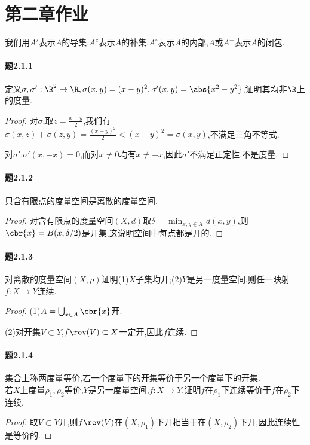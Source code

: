 \documentclass{article}
\begin{document}
\section{第二章作业}
我们用$A'$表示$A$的导集,$A^c$表示$A$的补集,$A^\circ$表示$A$的内部,$\overline{A}$或$A^-$表示$A$的闭包.

\paragraph{题2.1.1}定义$\sigma,\sigma':\R^2\to\R, \sigma(x,y)=(x-y)^2, \sigma'(x,y)=\abs{x^2-y^2}$,证明其均非$\R$上的度量.
\begin{proof}
    对$\sigma$,取$z=\frac{x+y}{2}$,我们有$\sigma(x,z)+\sigma(z,y)=\frac{(x-y)^2}{2}<(x-y)^2=\sigma(x,y)$,不满足三角不等式.

    对$\sigma'$,$\sigma'(x,-x)=0$,而对$x\neq 0$均有$x\neq -x$,因此$\sigma'$不满足正定性,不是度量.
\end{proof}

\paragraph{题2.1.2}只含有限点的度量空间是离散的度量空间.
\begin{proof}
    对含有限点的度量空间$(X,d)$取$\delta=\min_{x,y\in X}d(x,y)$,则$\cbr{x}=B(x,\delta/2)$是开集,这说明空间中每点都是开的.
\end{proof}

\paragraph{题2.1.3}对离散的度量空间$(X,\rho)$证明(1)$X$子集均开;(2)$Y$是另一度量空间,则任一映射$f:X\to Y$连续.
\begin{proof}
    (1)$A=\bigcup_{x\in A}\cbr{x}$开.

    (2)对开集$V\subset Y$,$f\rev(V)\subset X$一定开,因此$f$连续.
\end{proof}

\paragraph{题2.1.4}集合上称两度量等价,若一个度量下的开集等价于另一个度量下的开集.\\
若$X$上度量$\rho_1,\rho_2$等价,$Y$是另一度量空间,$f:X\to Y$.证明$f$在$\rho_1$下连续等价于$f$在$\rho_2$下连续.
\begin{proof}
    取$V\subset Y$开,则$f\rev(V)$在$(X,\rho_1)$下开相当于在$(X,\rho_2)$下开,因此连续性是等价的.
\end{proof}
\end{document}
